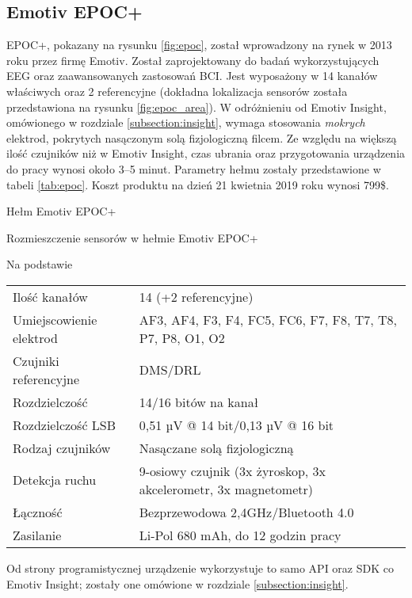 \documentclass[skorowidz,skroty]{dyplomWEZUT}
\begin{document}
\subsection{Emotiv EPOC+\label{subsection:epoc}}
EPOC+, pokazany na rysunku \vref{fig:epoc}, został wprowadzony na rynek w 2013 roku przez firmę Emotiv. Został zaprojektowany do badań wykorzystujących EEG oraz zaawansowanych zastosowań BCI\cite{emotiv_epoc}. Jest wyposażony w 14 kanałów właściwych oraz 2 referencyjne (dokładna lokalizacja sensorów została przedstawiona na rysunku \vref{fig:epoc_area}). W odróżnieniu od Emotiv Insight, omówionego w rozdziale \vref{subsection:insight}, wymaga stosowania \textit{mokrych} elektrod, pokrytych nasączonym solą fizjologiczną filcem. Ze względu na większą ilość czujników niż w Emotiv Insight, czas ubrania oraz przygotowania urządzenia do pracy wynosi około 3--5 minut. Parametry hełmu zostały przedstawione w tabeli \vref{tab:epoc}. Koszt produktu na dzień 21 kwietnia 2019 roku wynosi 799\$.

{Hełm Emotiv EPOC+\label{fig:epoc}}
{\cite{emotiv_epoc}}

{Rozmieszczenie sensorów w hełmie Emotiv EPOC+\label{fig:epoc_area}}
{\cite{emotiv_epoc}}

{Na podstawie \cite{emotiv_comparison}}
{
    \begin{tabular}{l|l}
        Ilość kanałów & 14 (+2 referencyjne)\\
        Umiejscowienie elektrod & AF3, AF4, F3, F4, FC5, FC6, F7, F8, T7, T8, P7, P8, O1, O2\\
        Czujniki referencyjne & DMS/DRL\\
        Rozdzielczość & 14/16 bitów na kanał\\
        Rozdzielczość LSB & 0,51 µV @ 14 bit/0,13 µV @ 16 bit\\
        Rodzaj czujników & Nasączane solą fizjologiczną\\
        Detekcja ruchu & 9-osiowy czujnik (3x żyroskop, 3x akcelerometr, 3x magnetometr)\\
        Łączność & Bezprzewodowa 2,4GHz/Bluetooth 4.0\\
        Zasilanie & Li-Pol 680 mAh, do 12 godzin pracy
    \end{tabular}
}

Od strony programistycznej urządzenie wykorzystuje to samo API oraz SDK co Emotiv Insight; zostały one omówione w rozdziale \vref{subsection:insight}.
\end{document}
